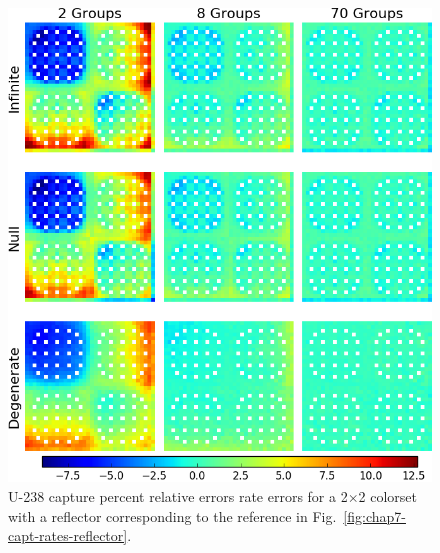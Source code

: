 \begin{figure}[h!]
\centering
\includegraphics[width=\linewidth]{figures/quantification/reflector/capt-err}
\caption[U-238 capture rate errors for a 2$\times$2 colorset with a reflector]{U-238 capture percent relative errors rate errors for a 2$\times$2 colorset with a reflector corresponding to the reference in Fig.~\ref{fig:chap7-capt-rates-reflector}.}
\label{fig:chap8-reflector-capt-err}
\end{figure}

\clearpage

